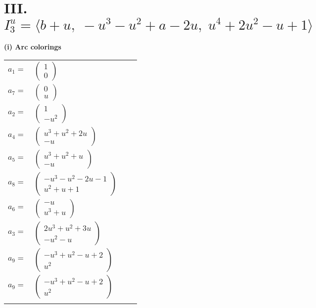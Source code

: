 \documentclass[1p]{elsarticle_modified}
\theoremstyle{definition}
\begin{document}
\centering \section*{III. $I^u_{3}= \langle b+u,\;- u^3- u^2+a-2 u,\;u^4+2 u^2- u+1 \rangle$}
\flushleft \textbf{(i) Arc colorings}\\
\begin{tabular}{m{7pt} m{180pt} m{7pt} m{180pt} }
\flushright $a_{1}=$&$\begin{pmatrix}1\\0\end{pmatrix}$ \\
\flushright $a_{7}=$&$\begin{pmatrix}0\\u\end{pmatrix}$ \\
\flushright $a_{2}=$&$\begin{pmatrix}1\\- u^2\end{pmatrix}$ \\
\flushright $a_{4}=$&$\begin{pmatrix}u^3+u^2+2 u\\- u\end{pmatrix}$ \\
\flushright $a_{5}=$&$\begin{pmatrix}u^3+u^2+u\\- u\end{pmatrix}$ \\
\flushright $a_{8}=$&$\begin{pmatrix}- u^3- u^2-2 u-1\\u^2+u+1\end{pmatrix}$ \\
\flushright $a_{6}=$&$\begin{pmatrix}- u\\u^3+u\end{pmatrix}$ \\
\flushright $a_{3}=$&$\begin{pmatrix}2 u^3+u^2+3 u\\- u^2- u\end{pmatrix}$ \\
\flushright $a_{9}=$&$\begin{pmatrix}- u^3+u^2- u+2\\u^2\end{pmatrix}$\\ \flushright $a_{9}=$&$\begin{pmatrix}- u^3+u^2- u+2\\u^2\end{pmatrix}$\\&\end{tabular}
\end{document}

